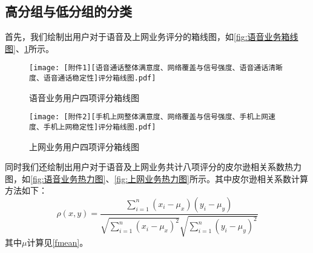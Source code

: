 \documentclass{MathorCupmodeling}
\begin{document}
	\subsection{高分组与低分组的分类}
	首先，我们绘制出用户对于语音及上网业务评分的箱线图，如\textcolor{blue}{\cref{fig:语音业务箱线图}}、\textcolor{blue}{\cref{fig:上网业务箱线图}}所示。
	\begin{figure}[H]
		\centering
		\begin{minipage}{0.48\linewidth}
			\centering
			\texttt{[image: [附件1][语音通话整体满意度、网络覆盖与信号强度、语音通话清晰度、语音通话稳定性]评分箱线图.pdf]}
			\caption{语音业务用户四项评分箱线图}
			\label{fig:语音业务箱线图}
		\end{minipage}
		\begin{minipage}{0.48\linewidth}
			\centering
			\texttt{[image: [附件2][手机上网整体满意度、网络覆盖与信号强度、手机上网速度、手机上网稳定性]评分箱线图.pdf]}
			\caption{上网业务用户四项评分箱线图}
			\label{fig:上网业务箱线图}
		\end{minipage}
	\end{figure}
	同时我们还绘制出用户对于语音及上网业务共计八项评分的皮尔逊相关系数热力图，如\textcolor{blue}{\cref{fig:语音业务热力图}}、\textcolor{blue}{\cref{fig:上网业务热力图}}所示。其中皮尔逊相关系数计算方法如下：
	\begin{equation}
		\rho\left(x,y\right)=\frac{\sum\limits_{i=1}^{n}\left(x_{i}-\mu_x\right)\left(y_{i}-\mu_y\right)}{\sqrt{\sum\limits_{i=1}^{n}\left(x_{i}-\mu_x\right)^{2}}\sqrt{\sum\limits_{i=1}^{n}\left(y_{i}-\mu_y\right)^{2}}} \label{fpearson}
		\end{equation}
	其中$\mu$计算见\textcolor{blue}{\eqref{fmean}}。
	
\end{document}
